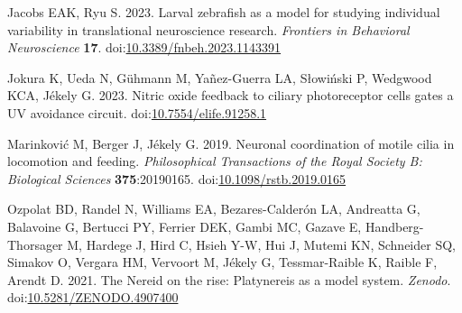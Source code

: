 \documentclass[
  11pt,
]{article}
\newlength{\cslhangindent}
\newenvironment{CSLReferences}[2] %
 {\begin{list}{}{%
  \setlength{\itemindent}{0pt}
  \setlength{\leftmargin}{0pt}
  \setlength{\parsep}{0pt}
  \ifodd #1
   \setlength{\leftmargin}{\cslhangindent}
   \setlength{\itemindent}{-1\cslhangindent}
  \fi
  \setlength{\itemsep}{#2\baselineskip}}}
 {\end{list}}
\begin{document}
\label{refs}
\begin{CSLReferences}{1}{0}
Jacobs EAK, Ryu S. 2023. Larval zebrafish as a model for studying
individual variability in translational neuroscience research.
\emph{Frontiers in Behavioral Neuroscience} \textbf{17}.
doi:\href{https://doi.org/10.3389/fnbeh.2023.1143391}{10.3389/fnbeh.2023.1143391}

Jokura K, Ueda N, Gühmann M, Yañez-Guerra LA, Słowiński P, Wedgwood KCA,
Jékely G. 2023. Nitric oxide feedback to ciliary photoreceptor cells
gates a UV avoidance circuit.
doi:\href{https://doi.org/10.7554/elife.91258.1}{10.7554/elife.91258.1}

Marinković M, Berger J, Jékely G. 2019. Neuronal coordination of motile
cilia in locomotion and feeding. \emph{Philosophical Transactions of the
Royal Society B: Biological Sciences} \textbf{375}:20190165.
doi:\href{https://doi.org/10.1098/rstb.2019.0165}{10.1098/rstb.2019.0165}

Ozpolat BD, Randel N, Williams EA, Bezares-Calderón LA, Andreatta G,
Balavoine G, Bertucci PY, Ferrier DEK, Gambi MC, Gazave E,
Handberg-Thorsager M, Hardege J, Hird C, Hsieh Y-W, Hui J, Mutemi KN,
Schneider SQ, Simakov O, Vergara HM, Vervoort M, Jékely G,
Tessmar-Raible K, Raible F, Arendt D. 2021. The Nereid on the rise:
Platynereis as a model system. \emph{Zenodo}.
doi:\href{https://doi.org/10.5281/ZENODO.4907400}{10.5281/ZENODO.4907400}

\end{CSLReferences}
\end{document}
